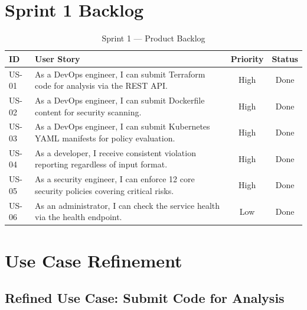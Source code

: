 \section{Sprint 1 Backlog}

\begin{table}[H]
\centering
\caption{Sprint 1 — Product Backlog}
\label{tab:sprint1-backlog}
\begin{tabular}{|p{0.8cm}|p{8.5cm}|c|c|}
\hline
\textbf{ID} & \textbf{User Story} & \textbf{Priority} & \textbf{Status} \\
\hline
US-01 & As a DevOps engineer, I can submit Terraform code for analysis via the REST API. & High & Done \\
\hline
US-02 & As a DevOps engineer, I can submit Dockerfile content for security scanning. & High & Done \\
\hline
US-03 & As a DevOps engineer, I can submit Kubernetes YAML manifests for policy evaluation. & High & Done \\
\hline
US-04 & As a developer, I receive consistent violation reporting regardless of input format. & High & Done \\
\hline
US-05 & As a security engineer, I can enforce 12 core security policies covering critical risks. & High & Done \\
\hline
US-06 & As an administrator, I can check the service health via the health endpoint. & Low & Done \\
\hline
\end{tabular}
\end{table}

\section{Use Case Refinement}

\subsection{Refined Use Case: Submit Code for Analysis}


